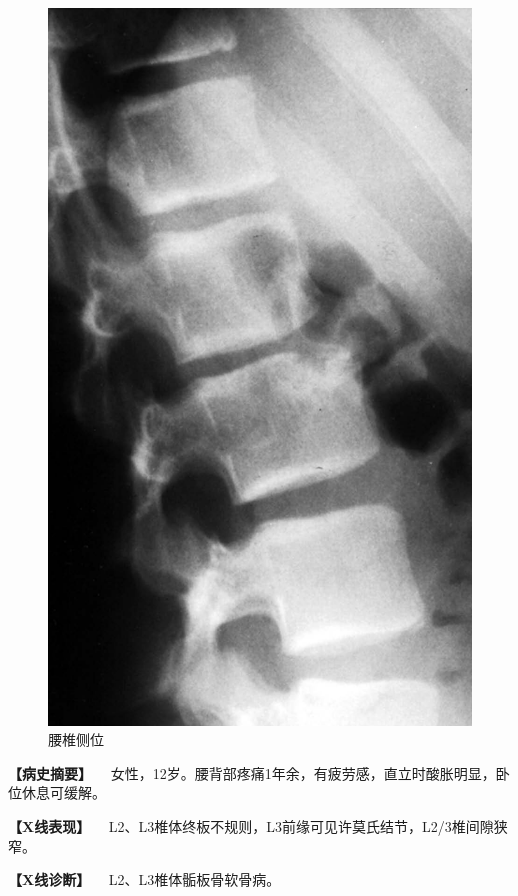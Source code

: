 \begin{figure}[!htbp]
 \centering
 \includegraphics{./images/Image00067.jpg}
 \captionsetup{justification=centering}
 \caption{腰椎侧位}
 \label{fig2-4-6}
  \end{figure} 

\textbf{【病史摘要】}
　女性，12岁。腰背部疼痛1年余，有疲劳感，直立时酸胀明显，卧位休息可缓解。

\textbf{【X线表现】}
　L2、L3椎体终板不规则，L3前缘可见许莫氏结节，L2/3椎间隙狭窄。

\textbf{【X线诊断】} 　L2、L3椎体骺板骨软骨病。

